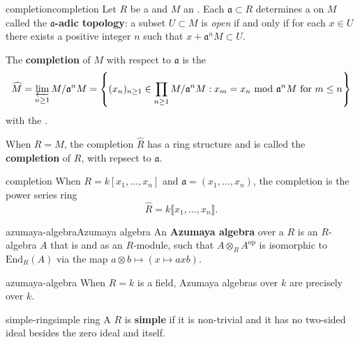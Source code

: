 \begin{topic}{completion}{completion}
    Let $R$ be a  and $M$ an . Each  $\mathfrak{a} \subset R$ determines a  on $M$ called the \textbf{$\mathfrak{a}$-adic topology}: a subset $U \subset M$ is \textit{open} if and only if for each $x \in U$ there exists a positive integer $n$ such that $x + \mathfrak{a}^n M \subset U$.
    
    The \textbf{completion} of $M$ with respect to $\mathfrak{a}$ is the 
    \[ \widehat{M} = \varprojlim_{n \ge 1} M / \mathfrak{a}^n M = \left\{ (x_n)_{n \ge 1} \in \prod_{n \ge 1} M / \mathfrak{a}^n M : x_m = x_n \text{ mod } \mathfrak{a}^n M \text{ for } m \le n \right\} \]
    with the  .
    
    When $R = M$, the completion $\widehat{R}$ has a ring structure and is called the \textbf{completion} of $R$, with repsect to $\mathfrak{a}$.
\end{topic}

\begin{example}{completion}
    When $R = k[x_1, \ldots, x_n]$ and $\mathfrak{a} = (x_1, \ldots, x_n)$, the completion is the power series ring
    \[ \widehat{R} = k\llbracket x_1, \ldots, x_n \rrbracket . \]
\end{example}

\begin{topic}{azumaya-algebra}{Azumaya algebra}
    An \textbf{Azumaya algebra} over a  $R$ is an $R$-algebra $A$ that is   and  as an $R$-module, such that $A \otimes_R A^\text{op}$ is isomorphic to $\text{End}_R(A)$ via the map $a \otimes b \mapsto (x \mapsto axb)$.
\end{topic}

\begin{example}{azumaya-algebra}
    When $R = k$ is a field, Azumaya algebras over $k$ are precisely  over $k$.
\end{example}

\begin{topic}{simple-ring}{simple ring}
    A  $R$ is \textbf{simple} if it is non-trivial and it has no two-sided ideal besides the zero ideal and itself.
\end{topic}

